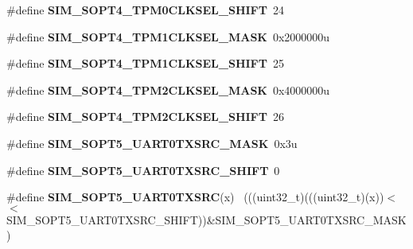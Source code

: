 \begin{DoxyCompactItemize}
\item 
\hypertarget{group___s_i_m___register___masks_ga608eeddec48cf22911d5f5a1ea52c261}{}\#define {\bfseries S\+I\+M\+\_\+\+S\+O\+P\+T4\+\_\+\+T\+P\+M0\+C\+L\+K\+S\+E\+L\+\_\+\+S\+H\+I\+F\+T}~24\label{group___s_i_m___register___masks_ga608eeddec48cf22911d5f5a1ea52c261}

\item 
\hypertarget{group___s_i_m___register___masks_ga049c795a05cfcabb4865bd94e9960d1c}{}\#define {\bfseries S\+I\+M\+\_\+\+S\+O\+P\+T4\+\_\+\+T\+P\+M1\+C\+L\+K\+S\+E\+L\+\_\+\+M\+A\+S\+K}~0x2000000u\label{group___s_i_m___register___masks_ga049c795a05cfcabb4865bd94e9960d1c}

\item 
\hypertarget{group___s_i_m___register___masks_gae2f48392a848aa2b9dd0f4f117682ff1}{}\#define {\bfseries S\+I\+M\+\_\+\+S\+O\+P\+T4\+\_\+\+T\+P\+M1\+C\+L\+K\+S\+E\+L\+\_\+\+S\+H\+I\+F\+T}~25\label{group___s_i_m___register___masks_gae2f48392a848aa2b9dd0f4f117682ff1}

\item 
\hypertarget{group___s_i_m___register___masks_gad5a902a0614ee968bf5f4e8b4d619631}{}\#define {\bfseries S\+I\+M\+\_\+\+S\+O\+P\+T4\+\_\+\+T\+P\+M2\+C\+L\+K\+S\+E\+L\+\_\+\+M\+A\+S\+K}~0x4000000u\label{group___s_i_m___register___masks_gad5a902a0614ee968bf5f4e8b4d619631}

\item 
\hypertarget{group___s_i_m___register___masks_ga7e0e458665aad403b0a67a515fa08ff3}{}\#define {\bfseries S\+I\+M\+\_\+\+S\+O\+P\+T4\+\_\+\+T\+P\+M2\+C\+L\+K\+S\+E\+L\+\_\+\+S\+H\+I\+F\+T}~26\label{group___s_i_m___register___masks_ga7e0e458665aad403b0a67a515fa08ff3}

\item 
\hypertarget{group___s_i_m___register___masks_ga11646c1292cb7aab3128e1e563847e32}{}\#define {\bfseries S\+I\+M\+\_\+\+S\+O\+P\+T5\+\_\+\+U\+A\+R\+T0\+T\+X\+S\+R\+C\+\_\+\+M\+A\+S\+K}~0x3u\label{group___s_i_m___register___masks_ga11646c1292cb7aab3128e1e563847e32}

\item 
\hypertarget{group___s_i_m___register___masks_ga0220b88df4a0747579d24b77f4db4e67}{}\#define {\bfseries S\+I\+M\+\_\+\+S\+O\+P\+T5\+\_\+\+U\+A\+R\+T0\+T\+X\+S\+R\+C\+\_\+\+S\+H\+I\+F\+T}~0\label{group___s_i_m___register___masks_ga0220b88df4a0747579d24b77f4db4e67}

\item 
\hypertarget{group___s_i_m___register___masks_gaae8f435ecf7230b287a09bcb1bad59e0}{}\#define {\bfseries S\+I\+M\+\_\+\+S\+O\+P\+T5\+\_\+\+U\+A\+R\+T0\+T\+X\+S\+R\+C}(x)                                ~(((uint32\+\_\+t)(((uint32\+\_\+t)(x))$<$$<$S\+I\+M\+\_\+\+S\+O\+P\+T5\+\_\+\+U\+A\+R\+T0\+T\+X\+S\+R\+C\+\_\+\+S\+H\+I\+F\+T))\&S\+I\+M\+\_\+\+S\+O\+P\+T5\+\_\+\+U\+A\+R\+T0\+T\+X\+S\+R\+C\+\_\+\+M\+A\+S\+K)\label{group___s_i_m___register___masks_gaae8f435ecf7230b287a09bcb1bad59e0}


\end{DoxyCompactItemize}
